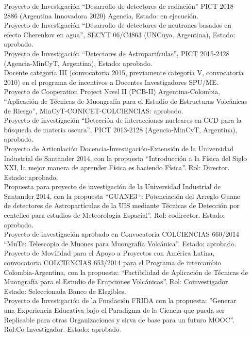  Proyecto de Investigación ``Desarrollo de detectores de radiación'' PICT 2018-2886 (Argentina Innovadora 2020) Agencia, Estado: en ejecución.\\
 Proyecto de Investigación ``Desarrollo de detectores de neutrones basados en efecto Cherenkov en agua'', SECYT 06/C4863 (UNCuyo, Argentina), Estado: aprobado.\\
 Proyecto de Investigación ``Detectores de Astropartículas'', PICT 2015-2428 (Agencia-MinCyT, Argentina), Estado: aprobado.\\
 Docente categoría III (convocatoria 2015, previamente categoría V, convocatoria 2010) en el programa de incentivos a Docentes Investigadores SPU/ME.\\
\ifres
\else
{} Proyecto de Cooperation Project Nivel II (PCB-II) Argentina-Colombia, ``Aplicación de Técnicas de Muongrafía para el Estudio de Estructuras Volcánicas de Riesgo'', MinCyT-CONICET-COLCIENCIAS: aprobado.\\
 Proyecto de investigación ``Detección de interacciones nucleares en CCD para la búsqueda de materia oscura'', PICT 2013-2128 (Agencia-MinCyT, Argentina), aprobado.\\
 Proyecto de Articulación Docencia-Investigación-Extensión de la Universidad Industrial de Santander 2014, con la propuesta ``Introducción a la Física del Siglo XXI, la mejor manera de aprender Física es haciendo Física''. Rol: Director. Estado: aprobado.\\
 Propuesta para proyecto de investigación de la Universidad Industrial de Santander 2014, con la propuesta ``GUANE3$^+$: Potenciación del Arreglo Guane de detectores de Astropartículas de la UIS mediante Técnicas de Detección por centelleo para estudios de Meteorología Espacial''. Rol: codirector. Estado: aprobado.\\
 Proyecto de investigación aprobado en Convocatoria COLCIENCIAS 660/2014 ``MuTe: Telescopio de Muones para Muongrafía Volcánica''. Estado: aprobado.\\
 Proyecto de Movilidad para el Apoyo a Proyectos con América Latina, convocatoria COLCIENCIAS 653/2014 para el Programa de intercambio Colombia-Argentina, con la propuesta: ``Factibilidad de Aplicación de Técnicas de Muongrafía para el Estudio de Erupciones Volcánicas''. Rol: Coinvestigador. Estado: Seleccionada Banco de Elegibles.\\
 Proyecto de Investigación de la Fundación FRIDA con la propuesta: ''Generar una Experiencia Educativa bajo el Paradigma de la Ciencia que pueda ser Replicable para otras Organizaciones y sirva de base para un futuro MOOC''. Rol:Co-Investigador. Estado: aprobado.\\
